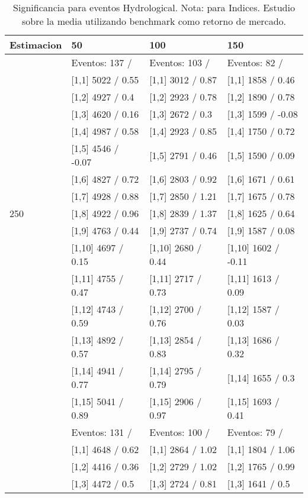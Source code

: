 \begin{table}

\caption{Significancia para eventos Hydrological. Nota: para Indices. Estudio sobre la media utilizando benchmark como retorno de mercado.}
\centering
\begin{tabular}[t]{llll}
\toprule
Estimacion & 50 & 100 & 150\\
\midrule
 & Eventos:  137 / & Eventos:  103 / & Eventos:  82 /\\
 & {}[1,1] 5022  / 0.55 & {}[1,1] 3012  / 0.87 & {}[1,1] 1858  / 0.46\\
 & {}[1,2] 4927  / 0.4 & {}[1,2] 2923  / 0.78 & {}[1,2] 1890  / 0.78\\
 & {}[1,3] 4620  / 0.16 & {}[1,3] 2672  / 0.3 & {}[1,3] 1599  / -0.08\\
 & {}[1,4] 4987  / 0.58 & {}[1,4] 2923  / 0.85 & {}[1,4] 1750  / 0.72\\
\addlinespace
 & {}[1,5] 4546  / -0.07 & {}[1,5] 2791  / 0.46 & {}[1,5] 1590  / 0.09\\
 & {}[1,6] 4827  / 0.72 & {}[1,6] 2803  / 0.92 & {}[1,6] 1671  / 0.61\\
 & {}[1,7] 4928  / 0.88 & {}[1,7] 2850  / 1.21 & {}[1,7] 1675  / 0.78\\
250 & {}[1,8] 4922  / 0.96 & {}[1,8] 2839  / 1.37 & {}[1,8] 1625  / 0.64\\
 & {}[1,9] 4763  / 0.44 & {}[1,9] 2737  / 0.74 & {}[1,9] 1587  / 0.08\\
\addlinespace
 & {}[1,10] 4697  / 0.15 & {}[1,10] 2680  / 0.44 & {}[1,10] 1602  / -0.11\\
 & {}[1,11] 4755  / 0.47 & {}[1,11] 2717  / 0.73 & {}[1,11] 1613  / 0.09\\
 & {}[1,12] 4743  / 0.59 & {}[1,12] 2700  / 0.76 & {}[1,12] 1587  / 0.03\\
 & {}[1,13] 4892  / 0.57 & {}[1,13] 2854  / 0.83 & {}[1,13] 1686  / 0.32\\
 & {}[1,14] 4941  / 0.77 & {}[1,14] 2795  / 0.79 & {}[1,14] 1655  / 0.3\\
\addlinespace
 & {}[1,15] 5041  / 0.89 & {}[1,15] 2906  / 0.97 & {}[1,15] 1693  / 0.41\\
 & Eventos:  131 / & Eventos:  100 / & Eventos:  79 /\\
 & {}[1,1] 4648  / 0.62 & {}[1,1] 2864  / 1.02 & {}[1,1] 1804  / 1.06\\
 & {}[1,2] 4416  / 0.36 & {}[1,2] 2729  / 1.02 & {}[1,2] 1765  / 0.99\\
 & {}[1,3] 4472  / 0.5 & {}[1,3] 2724  / 0.81 & {}[1,3] 1641  / 0.5\\

\end{tabular}
\end{table}
